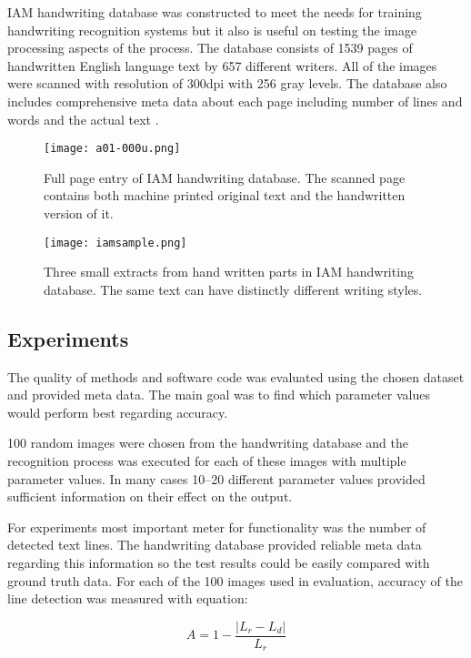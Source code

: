 \documentclass{article}
\begin{document}
    IAM handwriting database was constructed to meet the needs for training handwriting recognition systems but it also is useful on testing the image processing aspects of the process. The database consists of 1539 pages of handwritten English language text by 657 different writers. All of the images were scanned with resolution of 300dpi with 256 gray levels. The database also includes comprehensive meta data about each page including number of lines and words and the actual text \cite{IAM}.

    \begin{figure}[!ht]
      \centering
      \texttt{[image: a01-000u.png]}
      \caption{Full page entry of IAM handwriting database. The scanned page contains both machine printed original text and the handwritten version of it. \label{fig:iamsamplepage} }
    \end{figure}

    \begin{figure}[!ht]
      \centering
      \texttt{[image: iamsample.png]}
      \caption{Three small extracts from hand written parts in IAM handwriting database. The same text can have distinctly different writing styles. \label{fig:iamsamplelines} }
    \end{figure}

  \subsection{Experiments}
    The quality of methods and software code was evaluated using the chosen dataset and provided meta data. The main goal was to find which parameter values would perform best regarding accuracy.

    100 random images were chosen from the handwriting database and the recognition process was executed for each of these images with multiple parameter values. In many cases 10--20 different parameter values provided sufficient information on their effect on the output.

    For experiments most important meter for functionality was the number of detected text lines. The handwriting database provided reliable meta data regarding this information so the test results could be easily compared with ground truth data. For each of the 100 images used in evaluation, accuracy of the line detection was measured with equation:

    \begin{equation}
      A = 1-\frac{|L_r-L_d|}{L_r}
    \end{equation}
\end{document}
